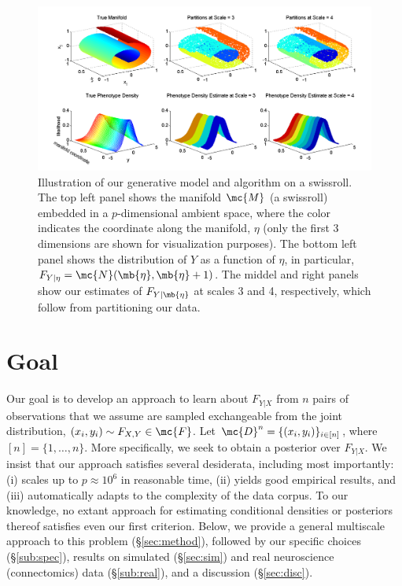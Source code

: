 \begin{figure}[htbp]
	\centering
		\includegraphics[width=1\linewidth]{../figs/PartitionsDensity_27MAY}
	\caption{Illustration of our generative model and algorithm on a swissroll. The top left panel shows the manifold $\mc{M}$ (a swissroll) embedded in a $p$-dimensional ambient space, where the color indicates the coordinate along the manifold, $\eta$ (only the first 3 dimensions are shown for visualization purposes). The bottom left panel shows the distribution of $Y$ as a function of $\eta$, in particular, $F_{Y|\eta}=\mc{N}(\mb{\eta},\mb{\eta}+1)$. The middel and right panels show our estimates of $F_{Y|\mb{\eta}}$ at scales 3 and 4, respectively, which follow from partitioning our data.}
	\label{fig:swiss}
\end{figure}


\section{Goal} \label{sec:goal}

Our goal is to develop an approach to learn about $F_{Y|X}$ from $n$ pairs of observations that we assume are sampled exchangeable from the joint distribution, $(x_i,y_i) \sim F_{X,Y} \in \mc{F}$. Let $\mc{D}^n=\{(x_i,y_i)\}_{i \in [n]}$, where $[n]=\{1,\ldots, n\}$.  More specifically, we seek to obtain a posterior over $F_{Y|X}$.  We insist that our approach satisfies several desiderata, including most importantly: (i) scales up to $p \approx 10^6$ in reasonable time,  (ii) yields good empirical results, and (iii) automatically adapts to the complexity of the data corpus.  To our knowledge, no extant approach for estimating conditional densities or posteriors thereof satisfies even our first criterion. Below, we provide a general multiscale approach to this problem (\S \ref{sec:method}), followed by our specific choices (\S \ref{sub:spec}), results on simulated (\S \ref{sec:sim}) and real neuroscience (connectomics) data (\S \ref{sub:real}), and a discussion (\S \ref{sec:disc}).


